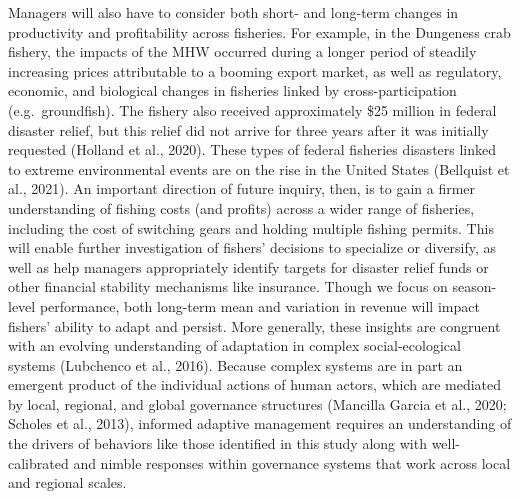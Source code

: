 \documentclass[]{elsarticle} %
\begin{document}
Managers will also have to consider both short- and long-term changes in
productivity and profitability across fisheries. For example, in the
Dungeness crab fishery, the impacts of the MHW occurred during a longer
period of steadily increasing prices attributable to a booming export
market, as well as regulatory, economic, and biological changes in
fisheries linked by cross-participation (e.g.~groundfish). The fishery
also received approximately \$25 million in federal disaster relief, but
this relief did not arrive for three years after it was initially
requested (Holland et al., 2020). These types of federal fisheries
disasters linked to extreme environmental events are on the rise in the
United States (Bellquist et al., 2021). An important direction of future
inquiry, then, is to gain a firmer understanding of fishing costs (and
profits) across a wider range of fisheries, including the cost of
switching gears and holding multiple fishing permits. This will enable
further investigation of fishers' decisions to specialize or diversify,
as well as help managers appropriately identify targets for disaster
relief funds or other financial stability mechanisms like insurance.
Though we focus on season-level performance, both long-term mean and
variation in revenue will impact fishers' ability to adapt and persist.
More generally, these insights are congruent with an evolving
understanding of adaptation in complex social-ecological systems
(Lubchenco et al., 2016). Because complex systems are in part an
emergent product of the individual actions of human actors, which are
mediated by local, regional, and global governance structures (Mancilla
Garcia et al., 2020; Scholes et al., 2013), informed adaptive management
requires an understanding of the drivers of behaviors like those
identified in this study along with well-calibrated and nimble responses
within governance systems that work across local and regional scales.
\end{document}
